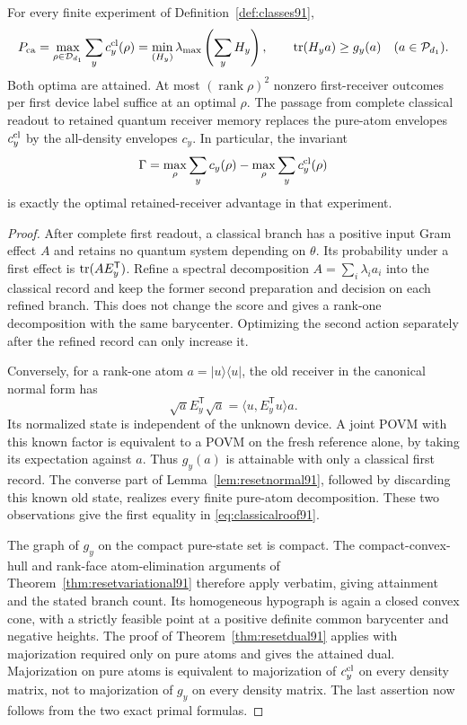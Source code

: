 \begin{theorem}
\label{thm:classicalroof91}
For every finite experiment of Definition~\ref{def:classes91},
\begin{equation}\label{eq:classicalroof91}
 P_{\rm ca}=\max_{\rho\in\mathcal D_{d_1}}\sum_yc_y^{\rm cl}(\rho)
 =\min_{(H_y)}\lambda_{\max}\left(\sum_yH_y\right),
 \qquad \operatorname{tr}(H_ya)\ge g_y(a)\quad(a\in\mathcal P_{d_1}).
\end{equation}
Both optima are attained.  At most
$(\operatorname{rank}\rho)^2$ nonzero first-receiver outcomes per
first device label suffice at an optimal $\rho$.
The passage from complete classical readout to retained quantum
receiver memory replaces the pure-atom envelopes $c_y^{\rm cl}$ by
the all-density envelopes $c_y$.  In particular, the invariant
\begin{equation}\label{eq:receivergap91}
 \Gamma=\max_\rho\sum_yc_y(\rho)
          -\max_\rho\sum_yc_y^{\rm cl}(\rho)
\end{equation}
is exactly the optimal retained-receiver advantage in that experiment.
\end{theorem}
\begin{proof}
After complete first readout, a classical branch has a positive input
Gram effect $A$ and retains no quantum system depending on $\theta$.
Its probability under a first effect is $\operatorname{tr}(AE_y^{\mathsf T})$.
Refine a spectral decomposition $A=\sum_i\lambda_i a_i$ into the
classical record and keep the former second preparation and decision
on each refined branch.  This does not change the score and gives a
rank-one decomposition with the same barycenter.  Optimizing the
second action separately after the refined record can only increase it.

Conversely, for a rank-one atom $a=|u\rangle\langle u|$, the old
receiver in the canonical normal form has
\[
 \sqrt a E_y^{\mathsf T}\sqrt a
 =\langle u,E_y^{\mathsf T}u\rangle a.
\]
Its normalized state is independent of the unknown device.  A joint
POVM with this known factor is equivalent to a POVM on the fresh
reference alone, by taking its expectation against $a$.
Thus $g_y(a)$ is attainable with only a classical first record.
The converse part of Lemma~\ref{lem:resetnormal91}, followed by discarding
this known old state, realizes every finite pure-atom decomposition.
These two observations give the first equality in
\eqref{eq:classicalroof91}.

The graph of $g_y$ on the compact pure-state set is compact.  The
compact-convex-hull and rank-face atom-elimination arguments of
Theorem~\ref{thm:resetvariational91} therefore apply verbatim, giving
attainment and the stated branch count.  Its homogeneous hypograph is
again a closed convex cone, with a strictly feasible point at a
positive definite common barycenter and negative heights.  The proof
of Theorem~\ref{thm:resetdual91} applies with majorization required only
on pure atoms and gives the attained dual.  Majorization on pure atoms
is equivalent to majorization of $c_y^{\rm cl}$ on every density matrix,
not to majorization of $g_y$ on every density matrix.  The last assertion
now follows from the two exact primal formulas.
\end{proof}

